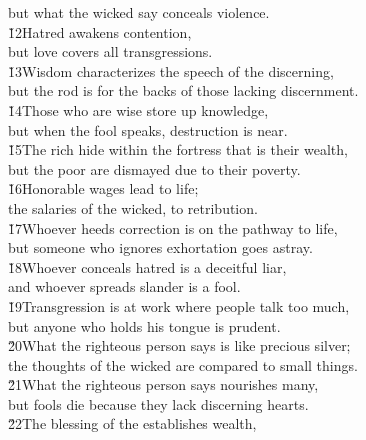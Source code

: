 \begin{poetry}
\poemll    but what the wicked say conceals violence. \\
\poeml \v{12}Hatred awakens contention, \\
\poemll    but love covers all transgressions. \\
\poeml \v{13}Wisdom characterizes the speech of the discerning, \\
\poemll    but the rod is for the backs of those lacking discernment. \\
\poeml \v{14}Those who are wise store up knowledge, \\
\poemll    but when the fool speaks, destruction is near. \\
\poeml \v{15}The rich hide within the fortress that is their wealth, \\
\poemll    but the poor are dismayed due to their poverty. \\
\poeml \v{16}Honorable wages lead to life; \\
\poemll    the salaries of the wicked, to retribution. \\
\poeml \v{17}Whoever heeds correction is on the pathway to life, \\
\poemll    but someone who ignores exhortation goes astray. \\
\poeml \v{18}Whoever conceals hatred is a deceitful liar, \\
\poemll    and whoever spreads slander is a fool. \\
\poeml \v{19}Transgression is at work where people talk too much, \\
\poemll    but anyone who holds his tongue is prudent. \\
\poeml \v{20}What the righteous person says is like precious silver; \\
\poemll    the thoughts of the wicked are compared to small things. \\
\poeml \v{21}What the righteous person says nourishes many, \\
\poemll    but fools die because they lack discerning hearts. \\
\poeml \v{22}The blessing of the  establishes wealth, \\

\end{poetry}
